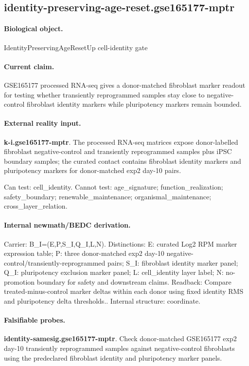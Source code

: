 \subsection{identity-preserving-age-reset.gse165177-mptr}

\paragraph{Biological object.} IdentityPreservingAgeResetUp cell-identity gate

\paragraph{Current claim.} GSE165177 processed RNA-seq gives a donor-matched fibroblast marker readout for testing whether transiently reprogrammed samples stay close to negative-control fibroblast identity markers while pluripotency markers remain bounded.

\paragraph{External reality input.}
\textbf{k-i.gse165177-mptr}. The processed RNA-seq matrices expose donor-labelled fibroblast negative-control and transiently reprogrammed samples plus iPSC boundary samples; the curated contact contains fibroblast identity markers and pluripotency markers for donor-matched exp2 day-10 pairs.

Can test: cell\_identity. Cannot test: age\_signature; function\_realization; safety\_boundary; renewable\_maintenance; organismal\_maintenance; cross\_layer\_relation.

\paragraph{Internal newmath/BEDC derivation.} Carrier: B\_I=(E,P,S\_I,Q\_I,L,N). Distinctions: E: curated Log2 RPM marker expression table; P: three donor-matched exp2 day-10 negative-control/transiently-reprogrammed pairs; S\_I: fibroblast identity marker panel; Q\_I: pluripotency exclusion marker panel; L: cell\_identity layer label; N: no-promotion boundary for safety and downstream claims. Readback: Compare treated-minus-control marker deltas within each donor using fixed identity RMS and pluripotency delta thresholds.. Internal structure: coordinate.

\paragraph{Falsifiable probes.}
\textbf{identity-samesig.gse165177-mptr}. Check donor-matched GSE165177 exp2 day-10 transiently reprogrammed samples against negative-control fibroblasts using the predeclared fibroblast identity and pluripotency marker panels.

